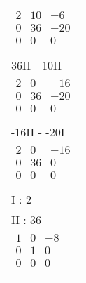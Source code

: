 \begin{longtable}{p{10cm}}
    $\displaystyle\begin{matrix}
                          2 & 10 & -6  \\
                          0 & 36 & -20 \\
                          0 & 0  & 0   \\
                      \end{matrix}$                                                            \\\hline
    36II - 10II                                                                            \\\hline\pagebreak[0]
    $\displaystyle\begin{matrix}
                          2 & 0  & -16 \\
                          0 & 36 & -20 \\
                          0 & 0  & 0   \\
                      \end{matrix}$                                                            \\\hline
    -16II - -20I                                                                           \\\hline\pagebreak[0]
    $\displaystyle\begin{matrix}
                          2 & 0  & -16 \\
                          0 & 36 & 0   \\
                          0 & 0  & 0   \\
                      \end{matrix}$                                                            \\\hline
    I : 2                                                                                  \\\hline\pagebreak[0]
    II : 36                                                                                \\\hline\pagebreak[0]
    $\displaystyle\begin{matrix}
                          1 & 0 & -8 \\
                          0 & 1 & 0  \\
                          0 & 0 & 0  \\
                      \end{matrix}$                                                            \\\hline
\end{longtable}

